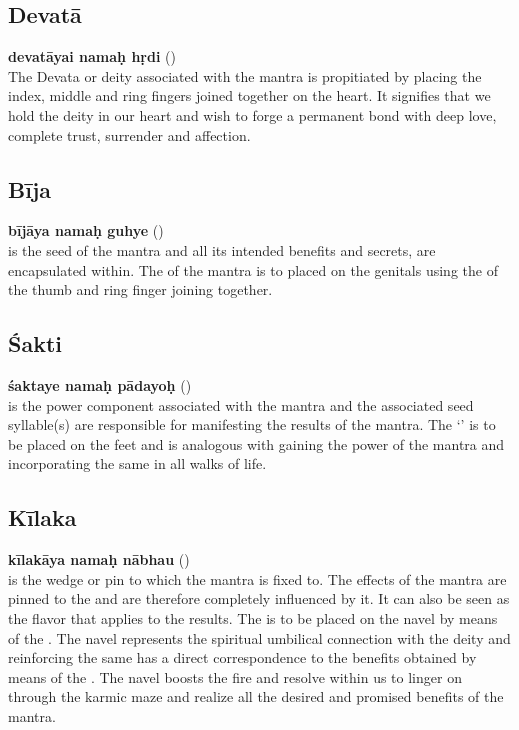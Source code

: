 \documentclass[twoside]{xarticle}
\begin{document}
\subsection{Devatā}

\textbf{devatāyai namaḥ hṛdi} ()\\
The Devata or deity associated with the mantra is propitiated by placing
the index, middle and ring fingers joined together on the heart. It signifies
that we hold the deity in our heart and wish to forge a permanent bond with
deep love, complete trust, surrender and affection.

\subsection{Bīja}

\textbf{bījāya namaḥ guhye} ()\\
 is the seed of the mantra and all its intended benefits and secrets,
are encapsulated within. The  of the mantra is to placed on
the genitals using the  of the thumb and ring finger joining
together.

\subsection{Śakti}

\textbf{śaktaye namaḥ pādayoḥ} ()\\
 is the power component associated with the mantra and the associated
seed syllable(s) are responsible for manifesting the results of the mantra.
The ‘’ is to be placed on the feet and is analogous with gaining
the power of the mantra and incorporating the same in all walks of life.

\subsection{Kīlaka}

\textbf{kīlakāya namaḥ nābhau} ()\\
 is the wedge or pin to which the mantra is fixed to. The effects of
the mantra are pinned to the  and are therefore completely
influenced by it. It can also be seen as the flavor that applies to the results.
The  is to be placed on the navel by means of the .
The navel represents the spiritual umbilical connection with the deity and
reinforcing the same has a direct correspondence to the benefits obtained by
means of the . The navel  boosts the fire
and resolve within us to linger on through the karmic maze and realize all
the desired and promised benefits of the mantra.
\end{document}
